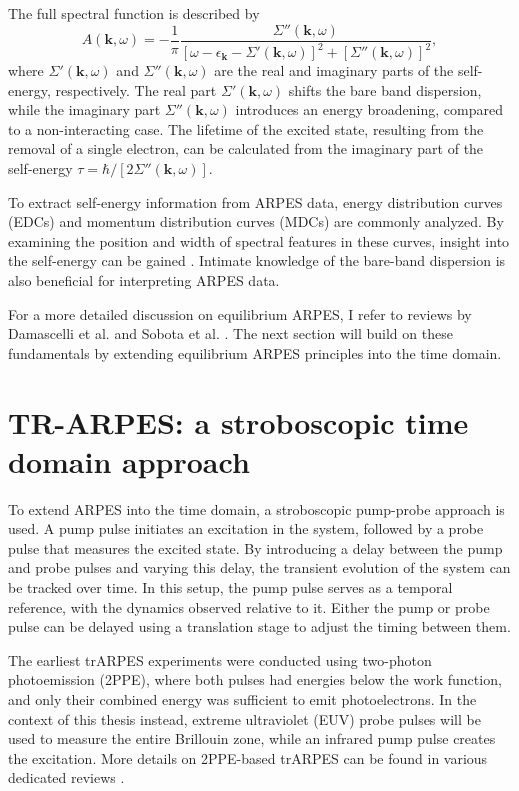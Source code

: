 The full spectral function is described by
\begin{equation} A(\mathbf{k}, \omega) = -\frac{1}{\pi} \frac{\Sigma''(\mathbf{k}, \omega)}{\left[ \omega - \epsilon_\mathbf{k} - \Sigma'(\mathbf{k}, \omega) \right]^2 + \left[ \Sigma''(\mathbf{k}, \omega) \right]^2},
\end{equation}
where $\Sigma'(\mathbf{k}, \omega)$ and $\Sigma''(\mathbf{k}, \omega)$ are the real and imaginary parts of the self-energy, respectively.
The real part $\Sigma'(\mathbf{k}, \omega)$ shifts the bare band dispersion, while the imaginary part $\Sigma''(\mathbf{k}, \omega)$ introduces an energy broadening, compared to a non-interacting case.
The lifetime of the excited state, resulting from the removal of a single electron, can be calculated from the imaginary part of the self-energy $\tau=\hbar/\left[2\Sigma''(\mathbf{k}, \omega)\right]$.

To extract self-energy information from ARPES data, energy distribution curves (EDCs) and momentum distribution curves (MDCs) are commonly analyzed.
By examining the position and width of spectral features in these curves, insight into the self-energy can be gained \cite{norman_extraction_1999, freericks_what_2021,kurleto_about_2021}.
Intimate knowledge of the bare-band dispersion is also beneficial for interpreting ARPES data.

For a more detailed discussion on equilibrium ARPES, I refer to reviews by Damascelli et al. and Sobota et al. \cite{damascelli_angle-resolved_2003,sobota_angle-resolved_2021}.
The next section will build on these fundamentals by extending equilibrium ARPES principles into the time domain.

\section{TR-ARPES: a stroboscopic time domain approach}

To extend ARPES into the time domain, a stroboscopic pump-probe approach is used.
A pump pulse initiates an excitation in the system, followed by a probe pulse that measures the excited state.
By introducing a delay between the pump and probe pulses and varying this delay, the transient evolution of the system can be tracked over time.
In this setup, the pump pulse serves as a temporal reference, with the dynamics observed relative to it.
Either the pump or probe pulse can be delayed using a translation stage to adjust the timing between them.

The earliest trARPES experiments were conducted using two-photon photoemission (2PPE), where both pulses had energies below the work function, and only their combined energy was sufficient to emit photoelectrons.
In the context of this thesis instead, extreme ultraviolet (EUV) probe pulses will be used to measure the entire Brillouin zone, while an infrared pump pulse creates the excitation.
More details on 2PPE-based trARPES can be found in various dedicated reviews \cite{damascelli_multiphoton_1996,bartoli_nonlinear_1997,hofer_time-resolved_1997,bovensiepen_elementary_2012,cui_transient_2014}.

